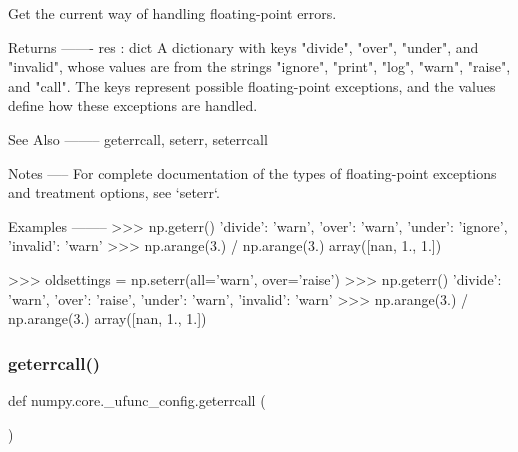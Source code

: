 \begin{DoxyVerb}Get the current way of handling floating-point errors.

Returns
-------
res : dict
    A dictionary with keys "divide", "over", "under", and "invalid",
    whose values are from the strings "ignore", "print", "log", "warn",
    "raise", and "call". The keys represent possible floating-point
    exceptions, and the values define how these exceptions are handled.

See Also
--------
geterrcall, seterr, seterrcall

Notes
-----
For complete documentation of the types of floating-point exceptions and
treatment options, see `seterr`.

Examples
--------
>>> np.geterr()
{'divide': 'warn', 'over': 'warn', 'under': 'ignore', 'invalid': 'warn'}
>>> np.arange(3.) / np.arange(3.)
array([nan,  1.,  1.])

>>> oldsettings = np.seterr(all='warn', over='raise')
>>> np.geterr()
{'divide': 'warn', 'over': 'raise', 'under': 'warn', 'invalid': 'warn'}
>>> np.arange(3.) / np.arange(3.)
array([nan,  1.,  1.])\end{DoxyVerb}
 \mbox{\label{namespacenumpy_1_1core_1_1__ufunc__config_a0821cf6e03cf8c0ca7c960dd6a4a6bd8}} 
\subsubsection{\texorpdfstring{geterrcall()}{geterrcall()}}
{\footnotesize\ttfamily def numpy.\+core.\+\_\+ufunc\+\_\+config.\+geterrcall (\begin{DoxyParamCaption}{ }\end{DoxyParamCaption})}

